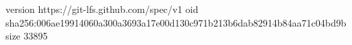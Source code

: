 version https://git-lfs.github.com/spec/v1
oid sha256:006ae19914060a300a3693a17e00d130c971b213b6dab82914b84aa71c04bd9b
size 33895
